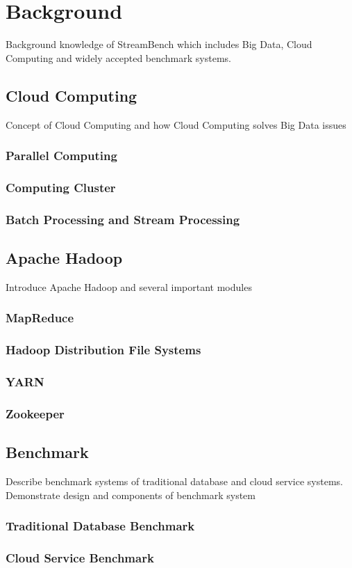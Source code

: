 \section{Background}
Background knowledge of StreamBench which includes Big Data, Cloud Computing and widely accepted benchmark systems. 

\subsection{Cloud Computing} 
Concept of Cloud Computing and how Cloud Computing solves Big Data issues

\subsubsection{Parallel Computing}
\subsubsection{Computing Cluster}
\subsubsection{Batch Processing and Stream Processing}

\subsection{Apache Hadoop}
Introduce Apache Hadoop and several important modules

\subsubsection{MapReduce}
\subsubsection{Hadoop Distribution File Systems}
\subsubsection{YARN}
\subsubsection{Zookeeper}


\subsection{Benchmark}
Describe benchmark systems of traditional database and cloud service systems. 
Demonstrate design and components of benchmark system

\subsubsection{Traditional Database Benchmark}
\subsubsection{Cloud Service Benchmark}


\clearpage

